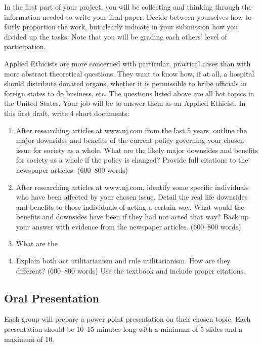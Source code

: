 \documentclass[]{article}
\providecommand{\tightlist}{%
  \setlength{\itemsep}{0pt}\setlength{\parskip}{0pt}}
\begin{document}
In the first part of your project, you will be collecting and thinking
through the information needed to write your final paper. Decide between
yourselves how to fairly proportion the work, but clearly indicate in
your submission how you divided up the tasks. Note that you will be
grading each others' level of participation.

Applied Ethicists are more concerned with particular, practical cases
than with more abstract theoretical questions. They want to know how, if
at all, a hospital should distribute donated organs, whether it is
permissible to bribe officials in foreign states to do business, etc.
The questions listed above are all hot topics in the United States. Your
job will be to answer them as an Applied Ethicist. In this first draft,
write 4 short documents:

\begin{enumerate}
\def\labelenumi{\arabic{enumi}.}
\tightlist
\item
  After researching articles at www.nj.com from the last 5 years,
  outline the major downsides and benefits of the current policy governing your chosen issue for society as a whole. What are the likely major downsides and benefits for society as a whole if the policy is changed? Provide full citations to the newspaper articles. 
  (600--800 words)
\item
 After researching articles at www.nj.com, identify some specific individuals who have been affected by your chosen issue.  Detail the real life downsides and benefits to those individuals of acting a certain way. What would the benefits and downsides have been if they had not acted that way? Back up your answer with evidence from the newspaper articles.    (600--800 words)

\item 
What are the

\item
  Explain both act utilitarianism and rule utilitarianism. How are they
  different? (600--800 words) Use the textbook and include proper citations.

\end{enumerate}

\subsection{Oral Presentation}\label{oral-presentation}

Each group will prepare a power point presentation on their chosen
topic. Each presentation should be 10--15 minutes long with a minimum of
5 slides and a maximum of 10.
\end{document}
